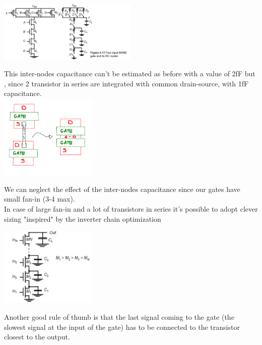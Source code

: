 \centering
\includegraphics[width=0.5\textwidth]{C6_2.png}\\
\raggedright

This inter-nodes capacitance can't be estimated as before with a value of 2fF but , since 2 transistor in series are integrated with common drain-source, with 1fF capacitance.\\


\centering
\includegraphics[width=0.35\textwidth]{C6_3.png}\\
\raggedright

We can neglect the effect of the inter-nodes capacitance since our gates have small fan-in (3-4 max).\\

\vspace{5mm}
In case of large fan-in and a lot of transistors in series it's possible to adopt clever sizing "inspired" by the inverter chain optimization 

\centering
\includegraphics[width=0.35\textwidth]{C6_4.png}\\
\raggedright

\vspace{5mm}
Another good rule of thumb is that the last signal coming to the gate (the slowest signal at the input of the gate) has to be connected to the transistor closest to the output.\\

